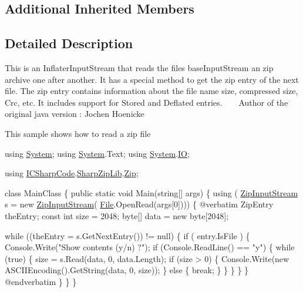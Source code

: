 \subsection*{Additional Inherited Members}


\subsection{Detailed Description}
This is an Inflater\+Input\+Stream that reads the files base\+Input\+Stream an zip archive one after another. It has a special method to get the zip entry of the next file. The zip entry contains information about the file name size, compressed size, Crc, etc. It includes support for Stored and Deflated entries. ~\newline
 ~\newline
Author of the original java version \+: Jochen Hoenicke 

This sample shows how to read a zip file 
\begin{DoxyCode}
\textcolor{keyword}{using} \hyperlink{namespace_system}{System};
\textcolor{keyword}{using} \hyperlink{namespace_system}{System}.Text;
\textcolor{keyword}{using} \hyperlink{namespace_system}{System}.\hyperlink{namespace_system_1_1_i_o}{IO};

\textcolor{keyword}{using} \hyperlink{namespace_i_c_sharp_code}{ICSharpCode}.\hyperlink{namespace_i_c_sharp_code_1_1_sharp_zip_lib}{SharpZipLib}.\hyperlink{namespace_i_c_sharp_code_1_1_sharp_zip_lib_1_1_zip}{Zip};

\textcolor{keyword}{class }MainClass
\{
    \textcolor{keyword}{public} \textcolor{keyword}{static} \textcolor{keywordtype}{void} Main(\textcolor{keywordtype}{string}[] args)
    \{
        \textcolor{keyword}{using} ( \hyperlink{class_i_c_sharp_code_1_1_sharp_zip_lib_1_1_zip_1_1_zip_input_stream_a453c9cf3787f5fa5210c415e3f1d8ae4}{ZipInputStream} s = \textcolor{keyword}{new} \hyperlink{class_i_c_sharp_code_1_1_sharp_zip_lib_1_1_zip_1_1_zip_input_stream_a453c9cf3787f5fa5210c415e3f1d8ae4}{ZipInputStream}(
      \hyperlink{namespace_lerp2_a_p_i_1_1_utility_af5d628470963cc0f18c37055b4170bf1a0b27918290ff5323bea1e3b78a9cf04e}{File}.OpenRead(args[0]))) \{
@verbatim
ZipEntry theEntry;
\textcolor{keyword}{const} \textcolor{keywordtype}{int} size = 2048;
byte[] data = \textcolor{keyword}{new} byte[2048];

\textcolor{keywordflow}{while} ((theEntry = s.GetNextEntry()) != null) \{
    \textcolor{keywordflow}{if} ( entry.IsFile ) \{
        Console.Write(\textcolor{stringliteral}{"Show contents (y/n) ?"});
        \textcolor{keywordflow}{if} (Console.ReadLine() == \textcolor{stringliteral}{"y"}) \{
            \textcolor{keywordflow}{while} (\textcolor{keyword}{true}) \{
                size = s.Read(data, 0, data.Length);
                \textcolor{keywordflow}{if} (size > 0) \{
                    Console.Write(\textcolor{keyword}{new} ASCIIEncoding().GetString(data, 0, size));
                \} \textcolor{keywordflow}{else} \{
                    \textcolor{keywordflow}{break};
                \}
            \}
        \}
    \}
\}
\textcolor{keyword}{@end}verbatim
        \}
    \}
\}
\end{DoxyCode}
 

